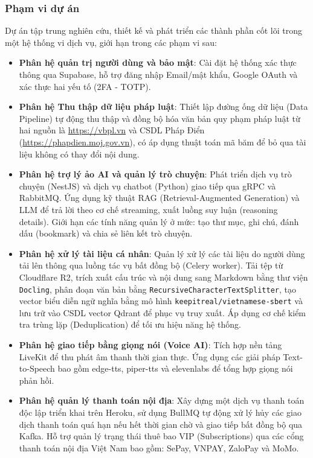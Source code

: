 \subsubsection{Phạm vi dự án}

Dự án tập trung nghiên cứu, thiết kế
và phát triển các thành phần cốt lõi
trong một hệ thống vi dịch vụ,
giới hạn trong các phạm vi sau:

\begin{itemize}

\item \textbf{Phân hệ quản trị người dùng và bảo mật}:
Cài đặt hệ thống xác thực thông qua Supabase,
hỗ trợ đăng nhập Email/mật khẩu,
Google OAuth và xác thực hai yếu tố (2FA - TOTP).

\item \textbf{Phân hệ Thu thập dữ liệu pháp luật}:
Thiết lập đường ống dữ liệu (Data Pipeline)
tự động thu thập và đồng bộ hóa văn bản quy phạm pháp luật
từ hai nguồn là \url{https://vbpl.vn}
và CSDL Pháp Điển (\url{https://phapdien.moj.gov.vn}),
có áp dụng thuật toán mã băm để bỏ qua tài liệu không có thay đổi nội dung.

\item \textbf{Phân hệ trợ lý ảo AI và quản lý trò chuyện}:
Phát triển dịch vụ trò chuyện (NestJS) và dịch vụ chatbot (Python) giao tiếp qua gRPC và RabbitMQ.
Ứng dụng kỹ thuật RAG (Retrieval-Augmented Generation) và LLM để trả lời theo cơ chế streaming, xuất luồng suy luận (reasoning details).
Giới hạn các tính năng quản lý ở mức: tạo thư mục, ghi chú, đánh dấu (bookmark) và chia sẻ liên kết trò chuyện.

\item \textbf{Phân hệ xử lý tài liệu cá nhân}:
Quản lý xử lý các tài liệu do người dùng tải lên thông qua luồng tác vụ bất đồng bộ (Celery worker).
Tải tệp từ Cloudflare R2,
trích xuất cấu trúc và nội dung sang Markdown bằng thư viện \texttt{Docling}, phân đoạn văn bản bằng \texttt{RecursiveCharacterTextSplitter}, tạo vector biểu diễn ngữ nghĩa bằng mô hình \texttt{keepitreal/vietnamese-sbert} và lưu trữ vào CSDL vector Qdrant để phục vụ truy xuất. Áp dụng cơ chế kiểm tra trùng lặp (Deduplication) để tối ưu hiệu năng hệ thống.

\item \textbf{Phân hệ giao tiếp bằng giọng nói (Voice AI)}:
Tích hợp nền tảng LiveKit để thu phát âm thanh thời gian thực. Ứng dụng các giải pháp Text-to-Speech bao gồm edge-tts, piper-tts và elevenlabs để tổng hợp giọng nói phản hồi.

\item \textbf{Phân hệ quản lý thanh toán nội địa}:
Xây dựng một dịch vụ thanh toán độc lập triển khai trên Heroku,
sử dụng BullMQ
tự động
xử lý hủy các giao dịch thanh toán quá hạn nếu hết thời gian chờ
và
giao tiếp bất đồng bộ qua Kafka.
Hỗ trợ quản lý trạng thái
thuê bao VIP (Subscriptions)
qua các cổng thanh toán nội địa Việt Nam bao gồm: SePay, VNPAY, ZaloPay và MoMo.
\end{itemize}
